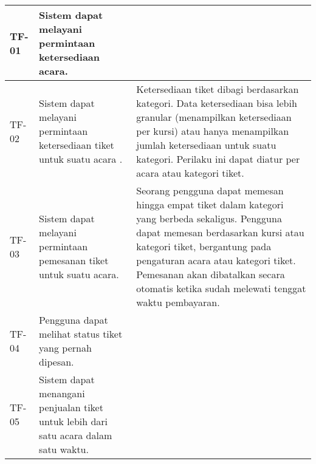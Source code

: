 \begin{longtable}{|l|p{}|p{}|}
    \hline
    \endlastfoot

    \hline
    TF-01       & Sistem dapat melayani permintaan ketersediaan acara.                                                           &                                                                                                                                                                                                                                                                                                                                                       \\
    \hline
    \hline
    TF-02       & Sistem dapat melayani permintaan ketersediaan tiket untuk suatu acara .                                        & Ketersediaan tiket dibagi berdasarkan kategori. Data ketersediaan bisa lebih granular (menampilkan ketersediaan per kursi) atau hanya menampilkan jumlah ketersediaan untuk suatu kategori. Perilaku ini dapat diatur per acara atau kategori tiket.                                                                                                  \\
    \hline
    \hline
    TF-03       & Sistem dapat melayani permintaan pemesanan tiket untuk suatu acara.                                            & Seorang pengguna dapat memesan hingga empat tiket dalam kategori yang berbeda sekaligus. Pengguna dapat memesan berdasarkan kursi atau kategori tiket, bergantung pada pengaturan acara atau kategori tiket. Pemesanan akan dibatalkan secara otomatis ketika sudah melewati tenggat waktu pembayaran.                                                \\
    \hline
    \hline
    TF-04       & Pengguna dapat melihat status tiket yang pernah dipesan.                                                       &                                                                                                                                                                                                                                                                                                                                                       \\
    \hline
    TF-05       & Sistem dapat menangani penjualan tiket untuk lebih dari satu acara dalam satu waktu.                           &                                                                                                                                                                                                                                                                                                                                                       \\

\end{longtable}
